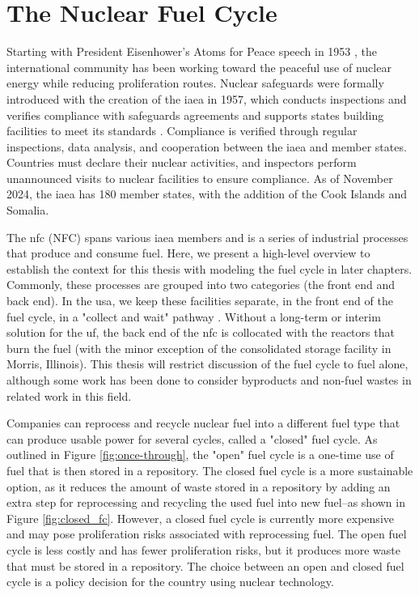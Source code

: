 \section{The Nuclear Fuel Cycle}
\label{sec:nfc}

Starting with President Eisenhower's Atoms for Peace speech in 1953
\cite{atoms_for_peace}, the international community has been working toward the peaceful use of nuclear energy while reducing proliferation routes. Nuclear safeguards were formally introduced with the creation of the \gls{iaea} in 1957, which conducts inspections and verifies compliance with safeguards agreements and supports states building facilities to meet its standards \cite{member_states}. Compliance is verified through regular inspections, data analysis, and cooperation between the \gls{iaea} and member states. Countries must declare their nuclear activities, and inspectors perform unannounced visits to nuclear facilities to ensure compliance. As of November 2024, the \gls{iaea} has 180 member states, with the addition of the Cook Islands and Somalia.

The \acrlong{nfc} (NFC) spans various \gls{iaea} members and is a series of industrial processes that produce and consume fuel. Here, we present a high-level overview to establish the context for this thesis with modeling the fuel cycle in later chapters. Commonly, these processes
are grouped into two categories (the front end and back end). In the \gls{usa},
we keep these facilities separate, in the front end of the fuel cycle, in
a "collect and wait" pathway \cite{cycle_risks}. Without a long-term or interim
solution for the \gls{uf}, the back end of the \gls{nfc} is collocated with the
reactors that burn the fuel (with the minor exception of the consolidated
storage facility in Morris, Illinois). This thesis will restrict discussion of
the fuel cycle to fuel alone, although some work has been done to consider
byproducts and non-fuel wastes in related work in this field.

Companies can reprocess and recycle nuclear fuel into a different fuel type
that can produce usable power for several cycles, called a "closed" fuel cycle.
As outlined in Figure \ref{fig:once-through}, the "open" fuel cycle is a
one-time use of fuel that is then stored in a repository. The closed fuel cycle
is a more sustainable option, as it reduces the amount of waste stored in a
repository by adding an extra step for reprocessing and recycling the used fuel
into new fuel--as shown in Figure \ref{fig:closed_fc}. However, a closed fuel
cycle is currently more expensive and may pose proliferation risks associated with reprocessing fuel. The open fuel cycle is less costly and has fewer
proliferation risks, but it produces more waste that must be stored in a
repository. The choice between an open and closed fuel cycle is a policy decision for the country using nuclear technology.

